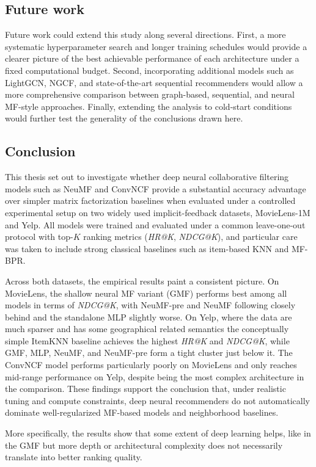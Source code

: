 \documentclass[11pt]{article}
\begin{document}
\subsection{Future work}

Future work could extend this study along several directions. First, a more systematic hyperparameter search and longer training schedules would provide a clearer picture of the best achievable performance of each architecture under a fixed computational budget. Second, incorporating additional models such as LightGCN, NGCF, and state-of-the-art sequential recommenders would allow a more comprehensive comparison between graph-based, sequential, and neural MF-style approaches. Finally, extending the analysis to  cold-start conditions would further test the generality of the conclusions drawn here.
\subsection{Conclusion}

This thesis set out to investigate whether deep neural collaborative filtering models such as NeuMF and ConvNCF provide a substantial accuracy advantage over simpler matrix factorization baselines when evaluated under a controlled experimental setup on two widely used implicit-feedback datasets, MovieLens-1M and Yelp. All models were trained and evaluated under a common leave-one-out protocol with top-$K$ ranking metrics (\emph{HR@K}, \emph{NDCG@K}), and particular care was taken to include strong classical baselines such as item-based KNN and MF-BPR.

Across both datasets, the empirical results paint a consistent picture. On MovieLens, the shallow neural MF variant (GMF) performs best among all models in terms of \emph{NDCG@K}, with NeuMF-pre and NeuMF following closely behind and the standalone MLP slightly worse. On Yelp, where the data are much sparser and has some geographical related semantics the conceptually simple ItemKNN baseline achieves the highest \emph{HR@K} and \emph{NDCG@K}, while GMF, MLP, NeuMF, and NeuMF-pre form a tight cluster just below it. The ConvNCF model performs particularly poorly on MovieLens and only reaches mid-range performance on Yelp, despite being the most complex architecture in the comparison. These findings support the conclusion that, under realistic tuning and compute constraints, deep neural recommenders do not automatically dominate well-regularized MF-based models and neighborhood baselines.

More specifically, the results show that some extent of deep learning helps, like in the GMF but more depth or architectural complexity does not necessarily translate into better ranking quality.





\end{document}
